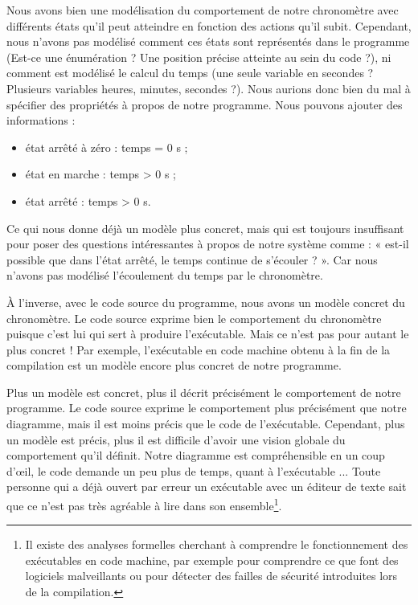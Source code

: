 Nous avons bien une modélisation du comportement de notre chronomètre avec
différents états qu'il peut atteindre en fonction des actions qu'il subit.
Cependant, nous n'avons pas modélisé comment ces états sont
représentés dans le programme (Est-ce une énumération ? Une position précise
atteinte au sein du code ?), ni comment est modélisé le calcul du temps (une seule
variable en secondes ? Plusieurs variables heures, minutes, secondes ?). Nous
aurions donc bien du mal à spécifier des propriétés à propos de notre programme.
Nous pouvons ajouter des informations :
\begin{itemize}
\item état arrêté à zéro : temps = 0 s ;
\item état en marche : temps > 0 s ;
\item état arrêté : temps > 0 s.
\end{itemize}


Ce qui nous donne déjà un modèle plus concret, mais qui est toujours insuffisant
pour poser des questions intéressantes à propos de notre système comme : « est-il
possible que dans l'état arrêté, le temps continue de s'écouler ? ». Car nous
n'avons pas modélisé l'écoulement du temps par le chronomètre.



À l'inverse, avec le code source du programme, nous avons un modèle concret du
chronomètre. Le code source exprime bien le comportement du chronomètre puisque
c'est lui qui sert à produire l'exécutable. Mais ce n'est pas pour autant le plus concret ! Par exemple, l'exécutable en code machine obtenu à la fin
de la compilation est un modèle encore plus concret de notre programme.



Plus un modèle est concret, plus il décrit précisément le comportement de notre
programme. Le code source exprime le comportement plus précisément que notre
diagramme, mais il est moins précis que le code de l'exécutable. Cependant, plus
un modèle est précis, plus il est difficile d'avoir une vision globale du
comportement qu'il définit. Notre diagramme est compréhensible en un coup d'\oe{}il,
le code demande un peu plus de temps, quant à l'exécutable ... Toute personne qui
a déjà ouvert par erreur un exécutable avec un éditeur de texte sait que ce n'est
pas très agréable à lire dans son ensemble\footnote{Il existe des analyses
formelles cherchant à comprendre le fonctionnement des exécutables en code
machine, par exemple pour comprendre ce que font des logiciels malveillants ou
pour détecter des failles de sécurité introduites lors de la compilation.}.



